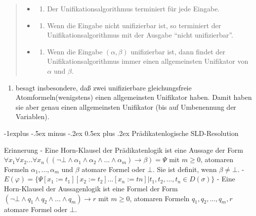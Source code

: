 \documentclass[a4paper]{article}
\makeatletter
\renewcommand{\subsection}{\@startsection{subsection}{2}{0mm}%
                {-1explus -.5ex minus -.2ex}%
                {0.5ex plus .2ex}%
                {\normalfont\normalsize\bfseries}}
\makeatother
\begin{document}
\begin{multicols}{3}
\begin{quote}
    \begin{itemize}
      \item
            \begin{enumerate}
              \def\labelenumi{(\Alph{enumi})}
              \item
                    Der Unifikationsalgorithmus terminiert für jede Eingabe.
            \end{enumerate}
      \item
            \begin{enumerate}
              \def\labelenumi{(\Alph{enumi})}
              \setcounter{enumi}{1}
              \item
                    Wenn die Eingabe nicht unifizierbar ist, so terminiert der
                    Unifikationsalgorithmus mit der Ausgabe ``nicht unifizierbar''.
            \end{enumerate}
      \item
            \begin{enumerate}
              \def\labelenumi{(\Alph{enumi})}
              \setcounter{enumi}{2}
              \item
                    Wenn die Eingabe $(\alpha,\beta)$ unifizierbar ist, dann findet der
                    Unifikationsalgorithmus immer einen allgemeinsten Unifikator von
                    $\alpha$ und $\beta$.
            \end{enumerate}
    \end{itemize}
  \end{quote}

  \begin{enumerate}
    \def\labelenumi{(\Alph{enumi})}
    \setcounter{enumi}{2}
    \itemsep1pt\parskip0pt
    \item
          besagt insbesondere, daß zwei unifizierbare gleichungsfreie
          Atomformeln(wenigstens) einen allgemeinsten Unifikator haben. Damit
          haben sie aber genau einen allgemeinsten Unifikator (bis auf
          Umbenennung der Variablen).
  \end{enumerate}

  \subsection{Prädikatenlogische
    SLD-Resolution}\label{pruxe4dikatenlogische-sld-resolution}

  Erinnerung - Eine Horn-Klausel der Prädikatenlogik ist eine Aussage der
  Form
  $\forall x_1 \forall x_2... \forall x_n ((\lnot\bot \wedge\alpha_1 \wedge\alpha_2 \wedge...\wedge\alpha_m)\rightarrow\beta)=\Psi$
  mit $m\geq 0$, atomaren Formeln $\alpha_1,...,\alpha_m$ und $\beta$
  atomare Formel oder $\bot$. Sie ist definit, wenn $\beta\not =\bot$. -
  $E(\varphi) =\{\Psi[x_1 :=t_1 ][x_2 :=t_2 ]...[x_n:=tn]|t_1 ,t_2 ,...,t_n\in D(\sigma)\}$
  - Eine Horn-Klausel der Aussagenlogik ist eine Formel der Form
  $(\lnot\bot\wedge q_1 \wedge q_2 \wedge... \wedge q_m)\rightarrow r$ mit
  $m\geq 0$, atomaren Formeln $q_1,q_2,...,q_m,r$ atomare Formel oder
  $\bot$.


\end{multicols}
\end{document}
